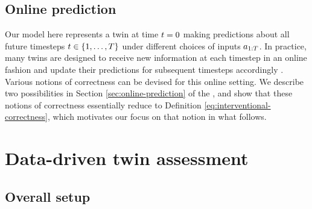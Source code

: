 
\subsection{Online prediction}

Our model here represents a twin at time $t = 0$ making predictions about all future timesteps $t \in \{1, \ldots, T\}$ under different choices of inputs $a_{1:T}$.
In practice, many twins are designed to receive new information at each timestep in an online fashion and update their predictions for subsequent timesteps accordingly \citep{grieves2017digital,niederer2021scaling}.
Various notions of correctness can be devised for this online setting.
We describe two possibilities in Section \ref{sec:online-prediction} of the \AppendixName, and show that these notions of correctness essentially reduce to Definition \ref{eq:interventional-correctness}, which motivates our focus on that notion in what follows.

\section{Data-driven twin assessment} \label{sec:data-driven-twin-assessment}

\subsection{Overall setup}

